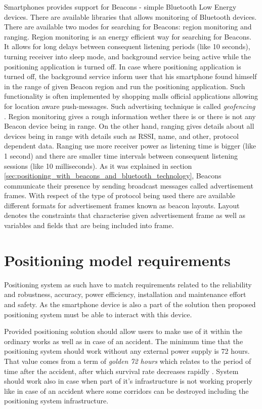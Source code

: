 \documentclass[../main.tex]{subfiles}
\begin{document}
Smartphones provides support for Beacons - simple Bluetooth Low Energy devices. There are available libraries that allows monitoring of Bluetooth devices. There are available two modes for searching for Beacons: region monitoring and ranging. Region monitoring is an energy efficient way for searching for Beacons. It allows for long delays between consequent listening periods (like 10 seconds), turning receiver into sleep mode, and background service being active while the positioning application is turned off. In case where positioning application is turned off, the background service inform user that his smartphone found himself in the range of given Beacon region and run the positioning application. Such functionality is often implemented by shopping malls official applications allowing for location aware push-messages. Such advertising technique is called \textit{geofencing} \cite{beacon_rssi_analysis}. Region monitoring gives a rough information wether there is or there is not any Beacon device being in range. On the other hand, ranging gives details about all devices being in range with details such as RSSI, name, and other, protocol dependent data. Ranging use more receiver power as listening time is bigger (like 1 second) and there are smaller time intervals between consequent listening sessions (like 10 milliseconds). As it was explained in section \ref{sec:positioning_with_beacons_and_bluetooth_technology}, Beacons communicate their presence by sending broadcast messages called advertisement frames. With respect of the type of protocol being used there are available different formats for advertisement frames known as beacon layouts. Layout denotes the constraints that characterise given advertisement frame as well as variables and fields that are being included into frame.


\section{Positioning model requirements}
Positioning system as such have to match requirements related to the reliability and robustness, accuracy, power efficiency, installation and maintenance effort and safety. As the smartphone device is also a part of the solution then proposed positioning system must be able to interact with this device.

Provided positioning solution should allow users to make use of it within the ordinary works as well as in case of an accident. The minimum time that the positioning system should work without any external power supply is 72 hours. That value comes from a term of \textit{golden 72 hours} which relates to the period of time after the accident, after which survival rate decreases rapidly \cite{positioning_tests}. System should work also in case when part of it's infrastructure is not working properly like in case of an accident where some corridors can be destroyed including the positioning system infrastructure.
\end{document}
